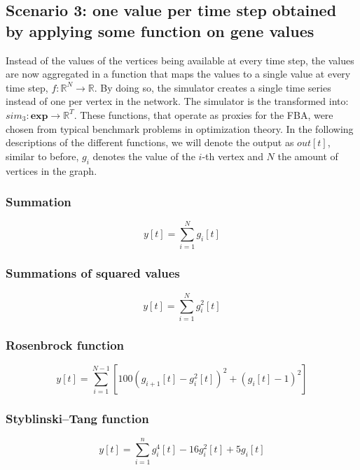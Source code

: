\subsection{Scenario 3: one value per time step obtained by applying some function on gene values}
Instead of the values of the vertices being available at every time step, the values are now aggregated in a function that maps the values to a single value at every time step, $f: \mathbb{R}^{N} \to \mathbb{R}$.
By doing so, the simulator creates a single time series instead of one per vertex in the network. The simulator is the transformed into: $sim_{3}: \mathbf{exp} \to \mathbb{R}^{T}$. 
These functions, that operate as proxies for the FBA, were chosen from typical benchmark problems in optimization theory. In the following descriptions of the different functions, we will denote the output as
$out[t]$, similar to before, $g_i$ denotes the value of the $i$-th vertex and $N$ the amount of vertices in the graph.
\subsubsection{Summation}
\begin{equation}
 y[t] = \sum_{i=1}^N g_i[t]
\end{equation}
\subsubsection{Summations of squared values}
\begin{equation}
 y[t] = \sum_{i=1}^N g_i^2[t]
\end{equation}
\subsubsection{Rosenbrock function}
\begin{equation}
 y[t] = \sum_{i=1}^{N-1}[100(g_{i+1}[t] - g_i^2[t])^2 + (g_i[t] - 1 )^2]
\end{equation}
\subsubsection{Styblinski–Tang function}
\begin{equation}
 y[t] = \sum_{i=1}^n g_i^4[t] - 16g_i^2[t] + 5g_i[t]
\end{equation}
